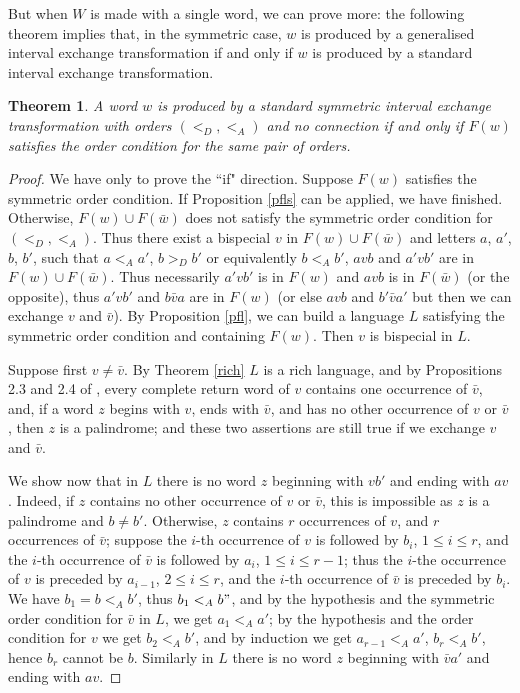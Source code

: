 \documentclass[12pt,a4paper]{amsart}
\newtheorem{theorem}{Theorem}
\begin{document}
 But when $W$ is made with a single word, we can prove more: the following theorem implies that, in the symmetric case, $w$ is produced by a
    generalised interval exchange transformation if and only if $w$ is produced by a standard interval exchange transformation.





 \begin{theorem} \label{c2} A word $w$ is produced by
a standard symmetric interval exchange transformation  with orders  $(<_D,<_A)$ and no connection  if and only if  $F({w})$ satisfies the order condition for the same pair of orders.\end{theorem}
\begin{proof}
We have only to prove the ``if"   direction. Suppose   $F({w})$ satisfies the symmetric order condition. If Proposition \ref{pfls}  can be applied, we have finished. Otherwise, $F(w)\cup F(\bar w)$ does not  satisfy the symmetric order condition for  
$(<_D,<_A)$. Thus there exist a bispecial   $v$  in $F(w)\cup F(\bar w)$ and letters $a$, $a'$, $b$, $b'$, such that  $a<_A a'$, $b>_D b'$ or equivalently $b<_A b'$, $avb$ and $a' vb'$ are in $F(w)\cup F(\bar w)$. Thus necessarily $a'vb'$ is in $F(w)$ and $avb$ is  in $F(\bar w)$ (or the 
opposite), thus $a'vb'$ and $b\bar v a$ are in $F(w)$ (or else  $avb$ and $b'\bar v a'$  but then  we can exchange $v$ and  $\bar v$).
By Proposition \ref{pfl}, we can build a language $L$ satisfying the symmetric order condition and containing $F(w)$. Then $v$ is  bispecial in $L.$  

Suppose first $v\neq \bar v$. By Theorem \ref{rich}  $L$ is a rich language, and by Propositions 2.3 and 2.4 of \cite{bdgz}, every complete return word of $v$
contains one occurrence of $\bar v$, and, if a word  $z$ begins with $v$, ends with $\bar v$, and has no other occurrence of $v$ or $\bar v$, then $z$ is a palindrome; and these two assertions are still true if we exchange $v$ and $\bar v$.

We show now that in $L$ there is no word $z$ beginning with  $vb'$ and ending with $av$. Indeed, if $z$ contains no other occurrence of $v$ or $\bar v$, this is impossible as $z$ is a palindrome and $b\neq b'$. Otherwise, $z$ contains $r$ occurrences of $v$, and $r$ occurrences of $\bar v$; suppose the $i$-th occurrence of $v$ is followed by $b_i$, $1\leq i\leq r$, and the $i$-th occurrence of $\bar v$ is followed by $a_i$, $1\leq i\leq r-1$; thus the $i$-the occurrence of $v$ is preceded by $a_{i-1}$, $2\leq i\leq r$,  and the $i$-th occurrence of $\bar v$ is preceded by $b_i$. We have $b_1=b<_A b'$, thus $b_1<_A b"$, and by the hypothesis and the symmetric order condition for $\bar v$ in $L$, we get $a_1<_A a'$; by the hypothesis and the order condition for $v$ we get $b_2<_Ab'$, and by induction we get $a_{r-1}<_Aa'$, $b_r<_Ab'$, hence $b_r$ cannot be $b$. Similarly  in $L$ there is no word $z$ beginning with  $\bar va'$ and ending with $av$. 


\end{proof}
\end{document}
